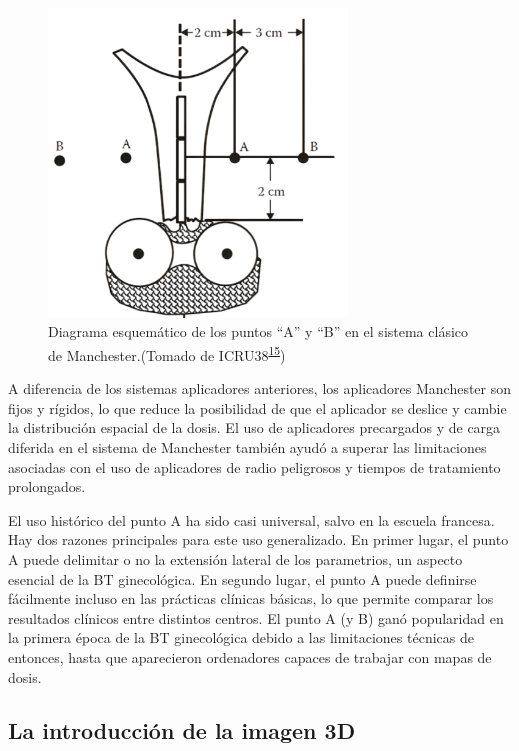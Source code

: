 \documentclass[
  a4paper,
]{scrreprt}
\begin{document}
\begin{figure}

{\centering \includegraphics[width=3.125in,height=\textheight]{img/SistemaManchester.png}

}

\caption{\label{fig-sistemamanchester}Diagrama esquemático de los puntos
``A'' y ``B'' en el sistema clásico de Manchester.(Tomado de
ICRU38\textsuperscript{\protect\hyperlink{ref-ICRU38}{15}})}

\end{figure}

A diferencia de los sistemas aplicadores anteriores, los aplicadores
Manchester son fijos y rígidos, lo que reduce la posibilidad de que el
aplicador se deslice y cambie la distribución espacial de la dosis. El
uso de aplicadores precargados y de carga diferida en el sistema de
Manchester también ayudó a superar las limitaciones asociadas con el uso
de aplicadores de radio peligrosos y tiempos de tratamiento prolongados.

El uso histórico del punto A ha sido casi universal, salvo en la escuela
francesa. Hay dos razones principales para este uso generalizado. En
primer lugar, el punto A puede delimitar o no la extensión lateral de
los parametrios, un aspecto esencial de la BT ginecológica. En segundo
lugar, el punto A puede definirse fácilmente incluso en las prácticas
clínicas básicas, lo que permite comparar los resultados clínicos entre
distintos centros. El punto A (y B) ganó popularidad en la primera época
de la BT ginecológica debido a las limitaciones técnicas de entonces,
hasta que aparecieron ordenadores capaces de trabajar con mapas de
dosis.

\hypertarget{sec-introduccionimagen3D}{%
\subsection{La introducción de la imagen
3D}\label{sec-introduccionimagen3D}}
\end{document}
